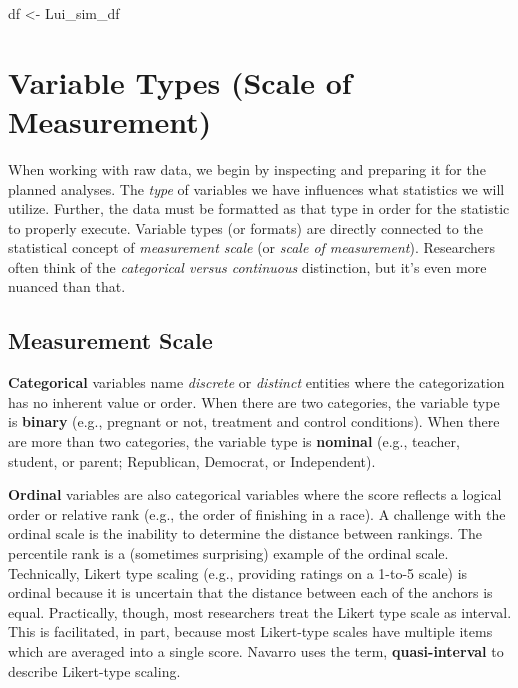 \documentclass[
  11pt,
]{book}
\newenvironment{Shaded}{\begin{snugshade}}{\end{snugshade}}
\newcommand{\NormalTok}[1]{#1}
\newcommand{\OtherTok}[1]{\textcolor[rgb]{0.37,0.37,0.37}{#1}}
\begin{document}
\begin{Shaded}
\begin{Highlighting}[]
\NormalTok{df }\OtherTok{\textless{}{-}}\NormalTok{ Lui\_sim\_df}
\end{Highlighting}
\end{Shaded}

\hypertarget{variable-types-scale-of-measurement}{%
\section{Variable Types (Scale of Measurement)}\label{variable-types-scale-of-measurement}}

When working with raw data, we begin by inspecting and preparing it for the planned analyses. The \emph{type} of variables we have influences what statistics we will utilize. Further, the data must be formatted as that type in order for the statistic to properly execute. Variable types (or formats) are directly connected to the statistical concept of \emph{measurement scale} (or \emph{scale of measurement}). Researchers often think of the \emph{categorical versus continuous} distinction, but it's even more nuanced than that.

\hypertarget{measurement-scale}{%
\subsection{Measurement Scale}\label{measurement-scale}}

\textbf{Categorical} variables name \emph{discrete} or \emph{distinct} entities where the categorization has no inherent value or order. When there are two categories, the variable type is \textbf{binary} (e.g., pregnant or not, treatment and control conditions). When there are more than two categories, the variable type is \textbf{nominal} (e.g., teacher, student, or parent; Republican, Democrat, or Independent).

\textbf{Ordinal} variables are also categorical variables where the score reflects a logical order or relative rank (e.g., the order of finishing in a race). A challenge with the ordinal scale is the inability to determine the distance between rankings. The percentile rank is a (sometimes surprising) example of the ordinal scale. Technically, Likert type scaling (e.g., providing ratings on a 1-to-5 scale) is ordinal because it is uncertain that the distance between each of the anchors is equal. Practically, though, most researchers treat the Likert type scale as interval. This is facilitated, in part, because most Likert-type scales have multiple items which are averaged into a single score. Navarro\citeyearpar{navarro_book_2020} uses the term, \textbf{quasi-interval} to describe Likert-type scaling.
\end{document}
